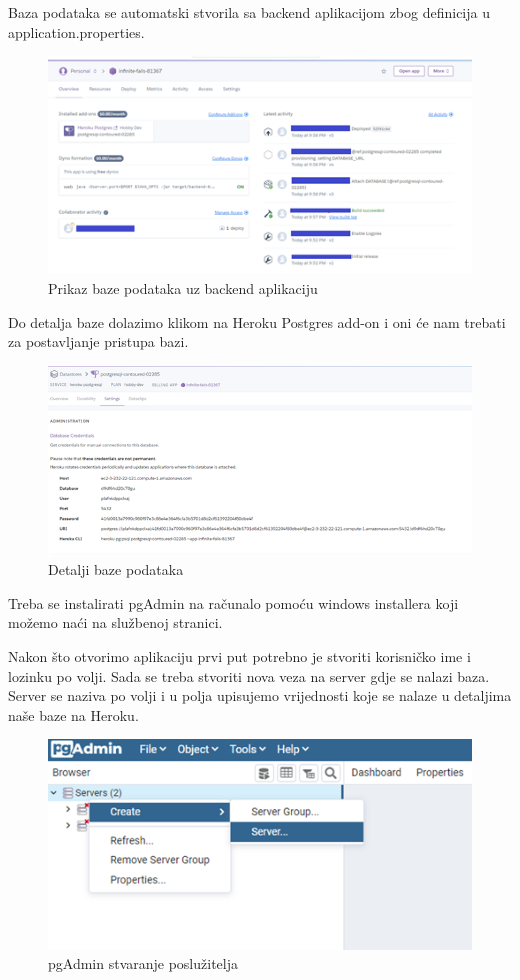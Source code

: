 Baza podataka se automatski stvorila sa backend aplikacijom zbog definicija u application.properties.  
				\begin{figure}[H] 					\centering 					                \includegraphics[width=\textwidth]{Dokumentacija/pogon/Picture10.png}
				\caption{Prikaz baze podataka uz backend aplikaciju}
				\end{figure}
				Do detalja baze dolazimo klikom na Heroku Postgres add-on i oni će nam trebati za postavljanje pristupa bazi. 
				\begin{figure}[H] 					\centering 					                \includegraphics[width=\textwidth]{Dokumentacija/pogon/Picture11.png}
				\caption{Detalji baze podataka}
				\end{figure}
				Treba se instalirati pgAdmin na računalo pomoću windows installera koji možemo naći na službenoj stranici. 

Nakon što otvorimo aplikaciju prvi put potrebno je stvoriti korisničko ime i lozinku po volji. Sada se treba stvoriti nova veza na server gdje se nalazi baza. Server se naziva po volji i u polja upisujemo vrijednosti koje se nalaze u detaljima naše baze na Heroku.  
				\begin{figure}[H] 					\centering 					                \includegraphics[width=\textwidth]{Dokumentacija/pogon/Picture12.png}
				\caption{pgAdmin stvaranje poslužitelja}
				\end{figure}
				 
